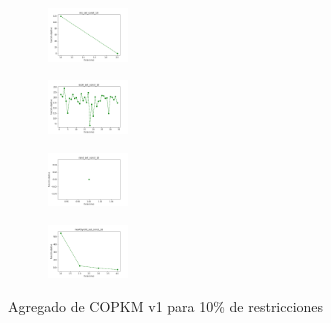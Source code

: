 \begin{figure}[H]
\begin{subfigure}
    \end{subfigure}
    \hfill
    \begin{subfigure}
        \centering
        \includegraphics[width=0.234\textwidth]{img/copkm/iris_set_const_10_3773969821_cost.png}
    \end{subfigure}
    \hfill
    \begin{subfigure}
        \centering
        \includegraphics[width=0.234\textwidth]{img/copkm/ecoli_set_const_10_3773969821_cost.png}
    \end{subfigure}
    \hfill
    \begin{subfigure}
        \centering
        \includegraphics[width=0.234\textwidth]{img/copkm/rand_set_const_10_3773969821_cost.png}
    \end{subfigure}
    \hfill
    \begin{subfigure}
        \centering
        \includegraphics[width=0.234\textwidth]{img/copkm/newthyroid_set_const_10_3773969821_cost.png}
    \end{subfigure}
    \caption{Agregado de COPKM v1 para 10\% de restricciones}
\end{figure}


\vspace*{\fill}

\newpage

\vspace*{\fill}

